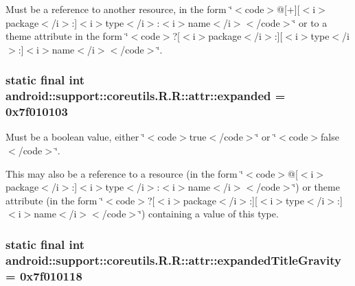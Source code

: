 Must be a reference to another resource, in the form \char`\"{}$<$code$>$@\mbox{[}+\mbox{]}\mbox{[}$<$i$>$package$<$/i$>$:\mbox{]}$<$i$>$type$<$/i$>$:$<$i$>$name$<$/i$>$$<$/code$>$\char`\"{} or to a theme attribute in the form \char`\"{}$<$code$>$?\mbox{[}$<$i$>$package$<$/i$>$:\mbox{]}\mbox{[}$<$i$>$type$<$/i$>$:\mbox{]}$<$i$>$name$<$/i$>$$<$/code$>$\char`\"{}. \hypertarget{classandroid_1_1support_1_1coreutils_1_1_r_1_1attr_eabccc734811c3c907fe42d01e7f3efd}{
\subsubsection[{expanded}]{\setlength{\rightskip}{0pt plus 5cm}static final int android::support::coreutils.R.R::attr::expanded = 0x7f010103}}
\label{classandroid_1_1support_1_1coreutils_1_1_r_1_1attr_eabccc734811c3c907fe42d01e7f3efd}


Must be a boolean value, either \char`\"{}$<$code$>$true$<$/code$>$\char`\"{} or \char`\"{}$<$code$>$false$<$/code$>$\char`\"{}. 

This may also be a reference to a resource (in the form \char`\"{}$<$code$>$@\mbox{[}$<$i$>$package$<$/i$>$:\mbox{]}$<$i$>$type$<$/i$>$:$<$i$>$name$<$/i$>$$<$/code$>$\char`\"{}) or theme attribute (in the form \char`\"{}$<$code$>$?\mbox{[}$<$i$>$package$<$/i$>$:\mbox{]}\mbox{[}$<$i$>$type$<$/i$>$:\mbox{]}$<$i$>$name$<$/i$>$$<$/code$>$\char`\"{}) containing a value of this type. \hypertarget{classandroid_1_1support_1_1coreutils_1_1_r_1_1attr_c6a060fcab29f91321710eda4fc8aa82}{
\subsubsection[{expandedTitleGravity}]{\setlength{\rightskip}{0pt plus 5cm}static final int android::support::coreutils.R.R::attr::expandedTitleGravity = 0x7f010118}}
\label{classandroid_1_1support_1_1coreutils_1_1_r_1_1attr_c6a060fcab29f91321710eda4fc8aa82}


